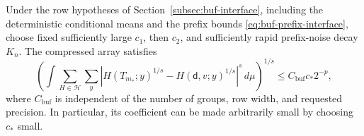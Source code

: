 \begin{proposition}
\label{prop:buf-error}
Under the row hypotheses of Section~\ref{subsec:buf-interface}, including
the deterministic conditional means and the prefix bounds
\eqref{eq:buf-prefix-interface}, choose fixed sufficiently large $c_1$,
then $c_2$, and sufficiently rapid prefix-noise decay $K_n$.
The compressed array satisfies
\begin{equation}
 \left(\int\sum_{H\in\mathcal H}\sum_y
  |H(T_{m_*};y)^{1/s}-H(\mathsf{d},v;y)^{1/s}|^s\,d\mu\right)^{1/s}
       \leq C_{\mathrm{buf}}c_*2^{-p},
 \label{eq:buf-integrated}
\end{equation}
where $C_{\mathrm{buf}}$ is independent of the number of groups, row
width, and requested precision. In particular, its coefficient can be
made arbitrarily small by choosing $c_*$ small.
\end{proposition}
